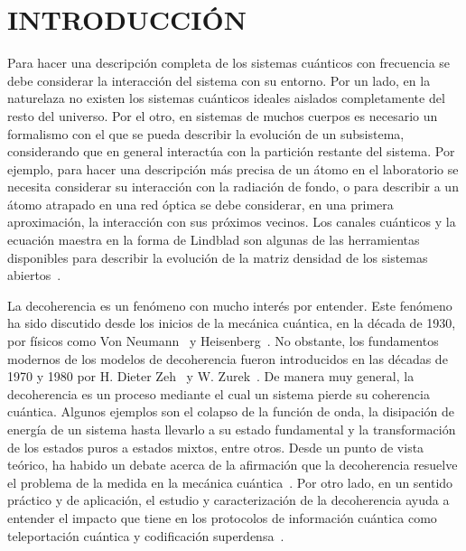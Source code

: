 \chapter{INTRODUCCIÓN}
Para hacer una descripción completa de los sistemas cuánticos 
con frecuencia se debe considerar la interacción del sistema con su entorno. Por un lado, 
en la naturelaza no existen los sistemas cuánticos ideales 
aislados completamente del resto del universo. 
Por el otro, en sistemas de muchos cuerpos es necesario un formalismo
con el que se pueda describir la evolución de un subsistema, considerando
que en general interactúa con la partición restante del sistema.
Por ejemplo, para hacer una descripción más precisa de un átomo en el laboratorio se
necesita considerar su interacción con la radiación de fondo, 
o para describir a un átomo atrapado en una red óptica se debe considerar, 
en una primera aproximación, la interacción con sus próximos vecinos.
Los canales cuánticos y la ecuación maestra en la forma de Lindblad son algunas
de las herramientas disponibles para describir la evolución de la 
matriz densidad de los sistemas abiertos~\cite{nielsen_chuang_2011}. 

La decoherencia es un fenómeno con mucho interés por entender. 
Este fenómeno ha sido discutido desde los inicios de la mecánica cuántica,
en la década de 1930, por físicos como
Von Neumann~\cite{von2018mathematical} y Heisenberg~\cite{bacciagaluppi2003role}.
No obstante, los fundamentos modernos de los modelos
de decoherencia fueron introducidos en las décadas de 1970 y 1980 
por H. Dieter Zeh~\cite{zeh1970interpretation}  y W. Zurek~\cite{zurek1981pointer}. 
De manera muy general, la decoherencia es un proceso mediante el cual 
un sistema pierde su coherencia cuántica. 
Algunos ejemplos son el colapso de 
la función de onda, la disipación de energía 
de un sistema hasta llevarlo a su estado fundamental y la transformación de los 
estados puros a estados mixtos, entre otros.
Desde un punto de vista teórico, ha habido un debate acerca de la afirmación
que la decoherencia resuelve el problema de la medida en 
la mecánica cuántica~\cite{bacciagaluppi2003role}.
Por otro lado, en un sentido práctico y de aplicación, 
el estudio y caracterización de la decoherencia 
ayuda a entender el impacto que tiene en los protocolos de información 
cuántica como teleportación cuántica y codificación 
superdensa~\cite{pepino2011open}.

